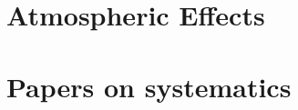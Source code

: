 \documentclass[
12pt, %
letterpaper, %
oneside, %
headinclude,footinclude, %
BCOR5mm, %
]{scrartcl}
\begin{document}
\section{Atmospheric Effects}

\section{Papers on systematics}




 


\renewcommand{\refname}{\spacedlowsmallcaps{References}} %


\end{document}
